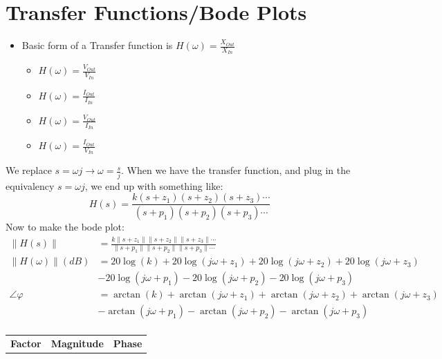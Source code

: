 \documentclass[10pt,letterpaper,final,twoside,notitlepage]{article}
\begin{document}
\section*{Transfer Functions/Bode Plots} \label{sec:Bode Plots}
	\begin{itemize}[noitemsep, nolistsep]
		\item Basic form of a Transfer function is $H \left( \omega \right) = \frac{X_{Out}}{X_{In}}$
		\begin{itemize}[noitemsep, nolistsep]
			\item $H \left( \omega \right) = \frac{V_{Out}}{V_{In}}$
			\item $H \left( \omega \right) = \frac{I_{Out}}{I_{In}}$
			\item $H \left( \omega \right) = \frac{V_{Out}}{I_{In}}$
			\item $H \left( \omega \right) = \frac{I_{Out}}{V_{In}}$
		\end{itemize}
	\end{itemize}
	We replace {\large $s = \omega j \rightarrow \omega = \frac{s}{j}$}. \newline
	When we have the transfer function, and plug in the equivalency $s = \omega j$, we end up with something like:
	\begin{equation*}
		H\left( s \right) = \frac{k \left(s + z_{1} \right) \left(s + z_{2} \right) \left(s + z_{3} \right) \cdots}{\left(s + p_{1} \right) \left(s + p_{2} \right) \left(s + p_{3} \right) \cdots}
	\end{equation*}
	Now to make the bode plot:
	\begin{align*} %
		\lVert H\left( s \right) \rVert &= \frac{k \lVert s + z_{1} \rVert \lVert s + z_{2} \rVert \lVert s + z_{3} \rVert \cdots}{\lVert s + p_{1} \rVert \lVert s + p_{2} \rVert \lVert s + p_{3} \rVert \cdots} \\
		\lVert H\left( \omega \right) \rVert (dB) &= 20\log \left( k \right) + 20\log \left( j\omega + z_{1} \right) + 20\log \left( j\omega + z_{2} \right) + 20\log \left( j\omega + z_{3} \right) \\
		&- 20\log \left( j\omega + p_{1} \right) - 20\log \left( j\omega + p_{2} \right) - 20\log \left( j\omega + p_{3} \right) \\
		\angle \varphi &= \arctan \left( k \right) + \arctan \left( j\omega + z_{1} \right) + \arctan \left( j\omega + z_{2} \right) + \arctan \left( j\omega + z_{3} \right) \\
		&-\arctan \left( j\omega + p_{1} \right) - \arctan \left( j\omega + p_{2} \right) - \arctan \left( j\omega + p_{3} \right) \\
	\end{align*}
	\begin{table}[h!] %
		\centering
		\renewcommand{\arraystretch}{1.4}
		\begin{tabular}{|c|c|c|}
			\hline
			\textbf{Factor} & \textbf{Magnitude} & \textbf{Phase}
		\end{tabular}
	\end{table}
\end{document}
